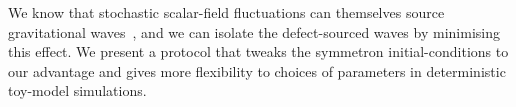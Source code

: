 We know that stochastic scalar-field fluctuations can themselves source gravitational waves~\citep{kawasakiStudyGravitationalRadiation2011}, and we can isolate the defect-sourced waves by minimising this effect. We present a protocol that tweaks the symmetron initial-conditions to our advantage and gives more flexibility to choices of parameters in deterministic toy-model simulations.

















